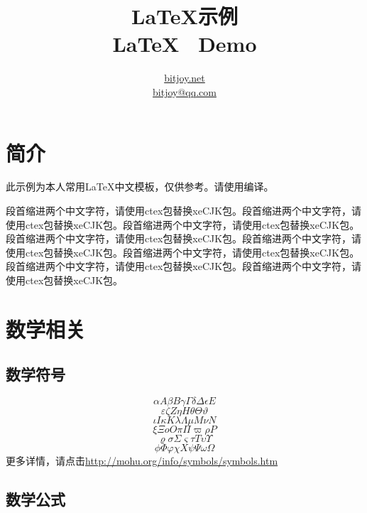 \documentclass[a4paper,12pt]{article}
\title{\LaTeX 示例\\ \LaTeX ~ Demo}
\author{\href{http://bitjoy.net}{bitjoy.net}\\ \href{mailto:bitjoy@qq.com}{bitjoy@qq.com}}
\begin{document}
\maketitle

\tableofcontents

\clearpage

\listoftables

\clearpage

\listoffigures

\clearpage


\section{简介}

此示例为本人常用\LaTeX 中文模板，仅供参考。请使用\XeLaTeX 编译。

段首缩进两个中文字符，请使用ctex包替换xeCJK包。段首缩进两个中文字符，请使用ctex包替换xeCJK包。段首缩进两个中文字符，请使用ctex包替换xeCJK包。段首缩进两个中文字符，请使用ctex包替换xeCJK包。段首缩进两个中文字符，请使用ctex包替换xeCJK包。段首缩进两个中文字符，请使用ctex包替换xeCJK包。段首缩进两个中文字符，请使用ctex包替换xeCJK包。段首缩进两个中文字符，请使用ctex包替换xeCJK包。

\section{数学相关}

\subsection{数学符号}

$$\alpha　A　 \beta　B　 \gamma　\Gamma　 \delta　\Delta　 \epsilon　E$$
$$ \varepsilon　 \zeta　Z　 \eta　H　 \theta　\Theta　 \vartheta$$
$$ \iota　I　 \kappa　K　 \lambda　\Lambda　 \mu　M　 \nu　N$$
$$\xi　\Xi　 o　O　 \pi　\Pi　 \varpi　 \rho　P$$
$$ \varrho　 \sigma　\Sigma　 \varsigma　 \tau　T　 \upsilon　\Upsilon$$
$$ \phi　\Phi　 \varphi　 \chi　X　 \psi　\Psi　 \omega　\Omega$$
更多详情，请点击\href{http://mohu.org/info/symbols/symbols.htm}{http://mohu.org/info/symbols/symbols.htm}

\subsection{数学公式}
\end{document}
